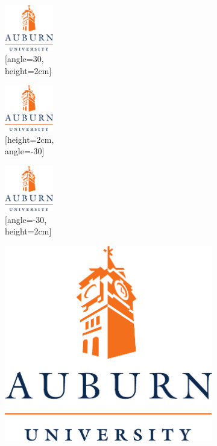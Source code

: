 \documentclass[article]{beamer}
\begin{document}
\begin{frame}
\begin{figure}[]
\begin{subfigure}[b]{0.3\linewidth}
    \end{subfigure}
    \hfill
    \begin{subfigure}[b]{0.3\linewidth}
      \centering
      \includegraphics[angle=30,height=2cm]{aulogo.pdf}
      \caption{[angle=30,\\height=2cm]}
    \end{subfigure}
    \begin{subfigure}[b]{0.3\linewidth}
      \centering
      \includegraphics[height=2cm,angle=-30]{aulogo.pdf}
      \caption{[height=2cm,\\angle=-30]}
    \end{subfigure}
    \hfill
    \begin{subfigure}[b]{0.3\linewidth}
      \centering
      \includegraphics[angle=-30,height=2cm]{aulogo.pdf}
      \caption{[angle=-30,\\height=2cm]}
    \end{subfigure}
    \hfill
    \begin{subfigure}[b]{0.3\linewidth}
      \centering
      \includegraphics[angle=-30,totalheight=2cm]{aulogo.pdf}

\end{subfigure}
\end{figure}
\end{frame}
\end{document}
